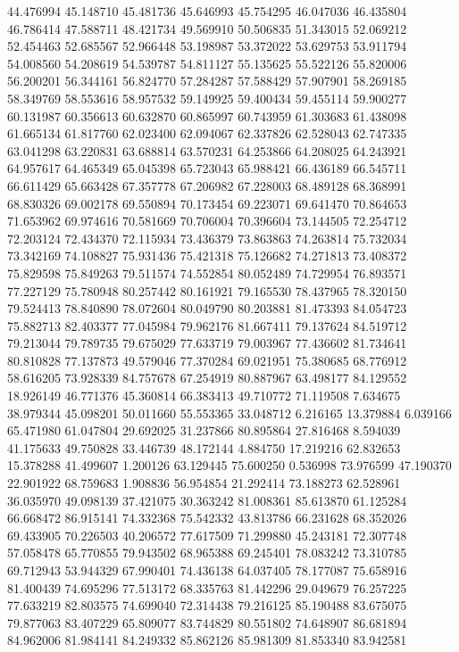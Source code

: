 44.476994
45.148710
45.481736
45.646993
45.754295
46.047036
46.435804
46.786414
47.588711
48.421734
49.569910
50.506835
51.343015
52.069212
52.454463
52.685567
52.966448
53.198987
53.372022
53.629753
53.911794
54.008560
54.208619
54.539787
54.811127
55.135625
55.522126
55.820006
56.200201
56.344161
56.824770
57.284287
57.588429
57.907901
58.269185
58.349769
58.553616
58.957532
59.149925
59.400434
59.455114
59.900277
60.131987
60.356613
60.632870
60.865997
60.743959
61.303683
61.438098
61.665134
61.817760
62.023400
62.094067
62.337826
62.528043
62.747335
63.041298
63.220831
63.688814
63.570231
64.253866
64.208025
64.243921
64.957617
64.465349
65.045398
65.723043
65.988421
66.436189
66.545711
66.611429
65.663428
67.357778
67.206982
67.228003
68.489128
68.368991
68.830326
69.002178
69.550894
70.173454
69.223071
69.641470
70.864653
71.653962
69.974616
70.581669
70.706004
70.396604
73.144505
72.254712
72.203124
72.434370
72.115934
73.436379
73.863863
74.263814
75.732034
73.342169
74.108827
75.931436
75.421318
75.126682
74.271813
73.408372
75.829598
75.849263
79.511574
74.552854
80.052489
74.729954
76.893571
77.227129
75.780948
80.257442
80.161921
79.165530
78.437965
78.320150
79.524413
78.840890
78.072604
80.049790
80.203881
81.473393
84.054723
75.882713
82.403377
77.045984
79.962176
81.667411
79.137624
84.519712
79.213044
79.789735
79.675029
77.633719
79.003967
77.436602
81.734641
80.810828
77.137873
49.579046
77.370284
69.021951
75.380685
68.776912
58.616205
73.928339
84.757678
67.254919
80.887967
63.498177
84.129552
18.926149
46.771376
45.360814
66.383413
49.710772
71.119508
7.634675
38.979344
45.098201
50.011660
55.553365
33.048712
6.216165
13.379884
6.039166
65.471980
61.047804
29.692025
31.237866
80.895864
27.816468
8.594039
41.175633
49.750828
33.446739
48.172144
4.884750
17.219216
62.832653
15.378288
41.499607
1.200126
63.129445
75.600250
0.536998
73.976599
47.190370
22.901922
68.759683
1.908836
56.954854
21.292414
73.188273
62.528961
36.035970
49.098139
37.421075
30.363242
81.008361
85.613870
61.125284
66.668472
86.915141
74.332368
75.542332
43.813786
66.231628
68.352026
69.433905
70.226503
40.206572
77.617509
71.299880
45.243181
72.307748
57.058478
65.770855
79.943502
68.965388
69.245401
78.083242
73.310785
69.712943
53.944329
67.990401
74.436138
64.037405
78.177087
75.658916
81.400439
74.695296
77.513172
68.335763
81.442296
29.049679
76.257225
77.633219
82.803575
74.699040
72.314438
79.216125
85.190488
83.675075
79.877063
83.407229
65.809077
83.744829
80.551802
74.648907
86.681894
84.962006
81.984141
84.249332
85.862126
85.981309
81.853340
83.942581
